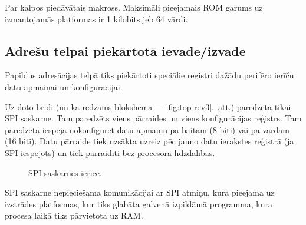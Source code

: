 	Par  kalpos  piedāvātais
	 makross.
	Maksimāli pieejamais ROM garums uz izmantojamās platformas ir
	1 kilobits jeb 64 vārdi.

\subsection{Adrešu telpai piekārtotā ievade/izvade}
	Papildus adresācijas telpā tiks piekārtoti speciālie reģistri dažādu
	perifēro ierīču datu apmaiņai un konfigurācijai.
	
	Uz doto brīdi (un kā redzams blokshēmā — \ref{fig:top-rev3}.~att.)
	paredzēta tikai SPI saskarne. Tam paredzēts viens pārraides un viens
	konfigurācijas reģistrs. Tam paredzēta iespēja nokonfigurēt datu
	apmaiņu pa baitam (8 biti) vai pa vārdam (16 biti). Datu pārraide tiek
	uzsākta uzreiz pēc jauno datu ierakstes reģistrā (ja SPI iespējots) un
	tiek pārraidīti bez procesora līdzdalības.
	
	\begin{figure}[thp]
		\centering
		\def\svgscale{1.25}
		{\ttfamily\scriptsize}
		\caption{SPI saskarnes ierīce.}
		\label{fig:spi}
	\end{figure}
	
	SPI saskarne nepieciešama komunikācijai ar SPI  atmiņu,
	kura pieejama uz izstrādes platformas,\cite[43.~lpp.]{FusionGuide}
	kur tiks glabāta galvenā izpildāmā programma, kura  procesa
	laikā tiks pārvietota uz RAM.
